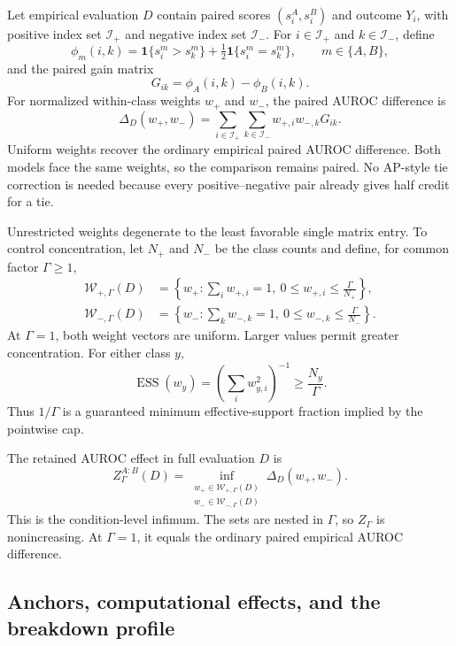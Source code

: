 \documentclass[11pt]{article}
\theoremstyle{remark}
\begin{document}
Let empirical evaluation $D$ contain paired scores $(s_i^A,s_i^B)$ and outcome
$Y_i$, with positive index set $\mathcal I_+$ and negative index set
$\mathcal I_-$. For $i\in\mathcal I_+$ and $k\in\mathcal I_-$, define
\[
\phi_m(i,k)
=
\mathbf 1\{s_i^m>s_k^m\}
+\tfrac12\mathbf 1\{s_i^m=s_k^m\},
\qquad m\in\{A,B\},
\]
and the paired gain matrix
\[
G_{ik}=\phi_A(i,k)-\phi_B(i,k).
\]
For normalized within-class weights $w_+$ and $w_-$, the paired AUROC
difference is
\begin{equation}
\Delta_D(w_+,w_-)
=
\sum_{i\in\mathcal I_+}
\sum_{k\in\mathcal I_-}
w_{+,i}w_{-,k}G_{ik}.
\label{eq:auroc-weighted}
\end{equation}
Uniform weights recover the ordinary empirical paired AUROC difference. Both
models face the same weights, so the comparison remains paired. No AP-style
tie correction is needed because every positive--negative pair already gives
half credit for a tie.

Unrestricted weights degenerate to the least favorable single matrix entry.
To control concentration, let $N_+$ and $N_-$ be the class counts and define,
for common factor $\Gamma\geq1$,
\begin{align}
\mathcal W_{+,\Gamma}(D)
&=
\left\{w_+:
\sum_iw_{+,i}=1,
\ 0\leq w_{+,i}\leq\frac{\Gamma}{N_+}
\right\},
\label{eq:positive-cap}\\
\mathcal W_{-,\Gamma}(D)
&=
\left\{w_-:
\sum_kw_{-,k}=1,
\ 0\leq w_{-,k}\leq\frac{\Gamma}{N_-}
\right\}.
\label{eq:negative-cap}
\end{align}
At $\Gamma=1$, both weight vectors are uniform. Larger values permit greater
concentration. For either class $y$,
\[
\operatorname{ESS}(w_y)
=
\left(\sum_iw_{y,i}^2\right)^{-1}
\geq
\frac{N_y}{\Gamma}.
\]
Thus $1/\Gamma$ is a guaranteed minimum effective-support fraction implied by
the pointwise cap.

The retained AUROC effect in full evaluation $D$ is
\begin{equation}
Z_\Gamma^{A:B}(D)
=
\inf_{\substack{
w_+\in\mathcal W_{+,\Gamma}(D)\\
w_-\in\mathcal W_{-,\Gamma}(D)}}
\Delta_D(w_+,w_-).
\label{eq:auroc-retained}
\end{equation}
This is the condition-level infimum. The sets are nested in $\Gamma$, so
$Z_\Gamma$ is nonincreasing. At $\Gamma=1$, it equals the ordinary paired
empirical AUROC difference.

\subsection{Anchors, computational effects, and the breakdown profile}
\end{document}
